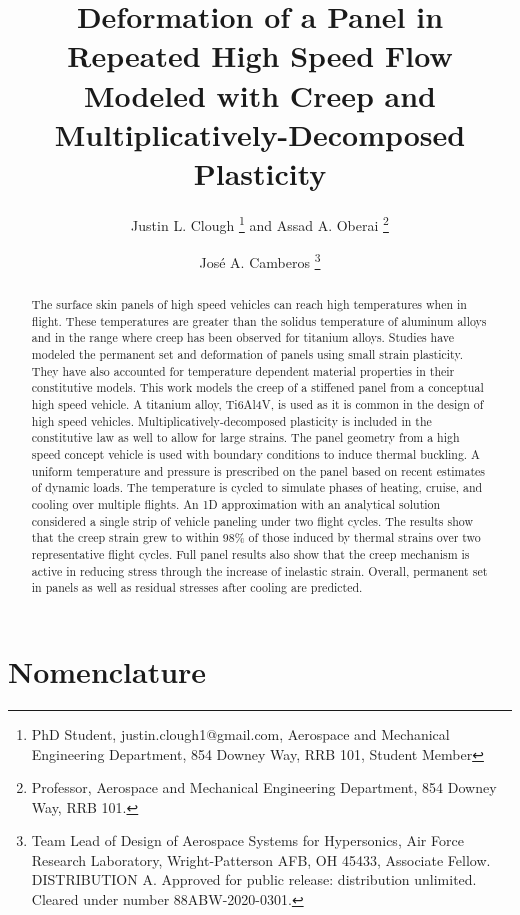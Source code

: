 \documentclass[conf]{new-aiaa}
\title{ Deformation of a Panel in Repeated High Speed Flow 
        Modeled with Creep and Multiplicatively-Decomposed Plasticity}
\author{Justin L. Clough%
        \footnote{
          PhD Student, 
          justin.clough1@gmail.com,
          Aerospace and Mechanical Engineering Department, 
          854 Downey Way, RRB 101,
          Student Member}
        and Assad A. Oberai%
        \footnote{  
          Professor, 
          Aerospace and Mechanical Engineering Department, 
          854 Downey Way, RRB 101.}}
\affil{University of Southern California,
       Los Angeles, CA, 90089}
\author{Jos\'e A. Camberos%
        \footnote{
          Team Lead of Design of Aerospace Systems for Hypersonics, 
          Air Force Research Laboratory,
          Wright-Patterson AFB, OH 45433,
          Associate Fellow.
          \newline
          \newline
            DISTRIBUTION A. Approved for public release: distribution unlimited. 
            Cleared under number 88ABW-2020-0301.}}
\affil{Air Force Research Laboratory, Wright-Patterson AFB,
       Dayton, OH, 45433}
\begin{document}
\maketitle

\begin{abstract} 
The surface skin panels of high speed vehicles can reach high 
temperatures when in flight. 
These temperatures are greater than the solidus temperature
of aluminum alloys and in the range where
creep has been observed for titanium alloys.
Studies have modeled the permanent set and deformation 
of panels using small strain plasticity.
They have also accounted for temperature
dependent material properties in their constitutive models.
This work models the creep of a stiffened panel
from a conceptual high speed vehicle.
A titanium alloy, Ti6Al4V,
is used as it is common in the design of high speed vehicles.
Multiplicatively-decomposed plasticity 
is included in the constitutive law as well to allow for large strains.
The panel geometry from a high speed concept vehicle is
used with boundary conditions to induce thermal buckling.
A uniform temperature and pressure is prescribed on the panel
based on recent estimates of dynamic loads.
The temperature is cycled to simulate phases of
heating, cruise, and cooling over multiple flights.
An 1D approximation with an analytical solution considered a single strip
of vehicle paneling under two flight cycles.
The results show that the creep strain
grew to within 98\% of those induced by thermal strains 
over two representative flight cycles.
Full panel results also show that the creep mechanism 
is active in reducing stress through the increase of 
inelastic strain.
Overall, permanent set in panels as well as 
residual stresses after cooling are predicted.
\end{abstract}

\section{Nomenclature} 
\end{document}
